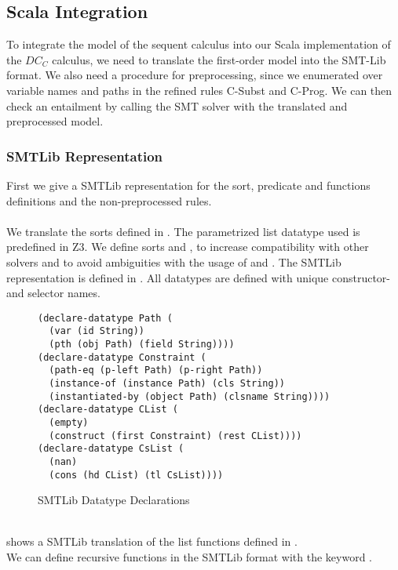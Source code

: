 \subsection{Scala Integration}
To integrate the model of the sequent calculus
into our Scala implementation of the $DC_C$ calculus,
we need to translate the first-order model into the SMT-Lib format.
We also need a procedure for preprocessing,
since we enumerated over variable names and paths
in the refined rules C-Subst and C-Prog.
We can then check an entailment by calling the SMT solver
with the translated and preprocessed model.

\subsubsection{SMTLib Representation}
First we give a SMTLib representation for
the sort, predicate and functions definitions
and the non-preprocessed rules.\\
\\
We translate the sorts defined in .
The parametrized list datatype used is predefined in Z3.
We define sorts  and ,
to increase compatibility with other solvers
and to avoid ambiguities with the usage of \Constrs and \Constrss.
The SMTLib representation is defined in .
All datatypes are defined with unique constructor- and selector names.
%
\begin{figure}[h]
\begin{lstlisting}[language=smtlib]
(declare-datatype Path (
  (var (id String))
  (pth (obj Path) (field String))))
(declare-datatype Constraint (
  (path-eq (p-left Path) (p-right Path))
  (instance-of (instance Path) (cls String))
  (instantiated-by (object Path) (clsname String))))
(declare-datatype CList (
  (empty)
  (construct (first Constraint) (rest CList))))
(declare-datatype CsList (
  (nan)
  (cons (hd CList) (tl CsList))))
\end{lstlisting}
\caption{SMTLib Datatype Declarations}
\label{fig:smtlib-sorts}
\end{figure}\\
%
 shows a SMTLib translation
of the list functions defined in .\\
We can define recursive functions in the SMTLib format
with the keyword .
